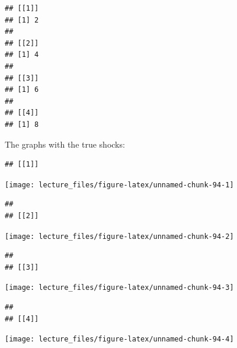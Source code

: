 \documentclass[]{book}
\newenvironment{Shaded}{\begin{snugshade}}{\end{snugshade}}
\newcommand{\KeywordTok}[1]{\textcolor[rgb]{0.13,0.29,0.53}{\textbf{#1}}}
\newcommand{\DataTypeTok}[1]{\textcolor[rgb]{0.13,0.29,0.53}{#1}}
\newcommand{\DecValTok}[1]{\textcolor[rgb]{0.00,0.00,0.81}{#1}}
\newcommand{\StringTok}[1]{\textcolor[rgb]{0.31,0.60,0.02}{#1}}
\newcommand{\CommentTok}[1]{\textcolor[rgb]{0.56,0.35,0.01}{\textit{#1}}}
\newcommand{\OperatorTok}[1]{\textcolor[rgb]{0.81,0.36,0.00}{\textbf{#1}}}
\newcommand{\NormalTok}[1]{#1}
\begin{document}
\begin{Shaded}
\end{Shaded}

\begin{verbatim}
## [[1]]
## [1] 2
## 
## [[2]]
## [1] 4
## 
## [[3]]
## [1] 6
## 
## [[4]]
## [1] 8
\end{verbatim}

The graphs with the true shocks:

\begin{verbatim}
## [[1]]
\end{verbatim}

\begin{center}\texttt{[image: lecture\_files/figure-latex/unnamed-chunk-94-1]} \end{center}

\begin{verbatim}
## 
## [[2]]
\end{verbatim}

\begin{center}\texttt{[image: lecture\_files/figure-latex/unnamed-chunk-94-2]} \end{center}

\begin{verbatim}
## 
## [[3]]
\end{verbatim}

\begin{center}\texttt{[image: lecture\_files/figure-latex/unnamed-chunk-94-3]} \end{center}

\begin{verbatim}
## 
## [[4]]
\end{verbatim}

\begin{center}\texttt{[image: lecture\_files/figure-latex/unnamed-chunk-94-4]} \end{center}
\end{document}
